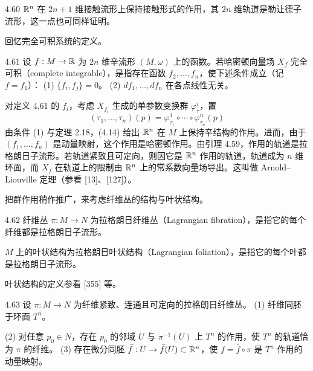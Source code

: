 \begin{remark}{4.60}
  $\mathbb{R}^n$ 在 $2n+1$ 维接触流形上保持接触形式的作用，其 $2n$ 维轨道是勒让德子流形，这一点也可同样证明。
\end{remark}

回忆完全可积系统的定义。

\begin{definition}{4.61}
  设 $f:M\to\mathbb{R}$ 为 $2n$ 维辛流形 $(M,\omega)$ 上的函数。若哈密顿向量场 $X_f$ 完全可积（complete integrable），是指存在函数 $f_2,\dots,f_n$，使下述条件成立（记 $f=f_1$）：
  (1) $\{f_i,f_j\}=0$。
  (2) $df_1,\dots,df_n$ 在各点线性无关。
\end{definition}

对定义 4.61 的 $f_i$，考虑 $X_{f_i}$ 生成的单参数变换群 $\varphi^i_\tau$，置
\begin{equation}
  (\tau_1,\dots,\tau_n)(p)=\varphi^1_{\tau_1}\circ\cdots\circ\varphi^n_{\tau_n}(p) \tag{4.14}
\end{equation}
由条件 (1) 与定理 2.18，(4.14) 给出 $\mathbb{R}^n$ 在 $M$ 上保持辛结构的作用。进而，由于 $(f_1,\dots,f_n)$ 是动量映射，这个作用是哈密顿作用。由引理 4.59，作用的轨道是拉格朗日子流形。若轨道紧致且可定向，则因它是 $\mathbb{R}^n$ 作用的轨道，轨道成为 $n$ 维环面，而 $X_f$ 在轨道上的限制由 $\mathbb{R}^n$ 上的常系数向量场导出。这叫做 Arnold–Liouville 定理（参看 [13]、[127]）。

把群作用稍作推广，来考虑纤维丛的结构与叶状结构。

\begin{definition}{4.62}
  纤维丛 $\pi:M\to N$ 为拉格朗日纤维丛（Lagrangian fibration），是指它的每个纤维都是拉格朗日子流形。

  $M$ 上的叶状结构为拉格朗日叶状结构（Lagrangian foliation），是指它的每个叶都是拉格朗日子流形。
\end{definition}

叶状结构的定义参看 [355] 等。

\begin{theorem*}{4.63}
  设 $\pi:M\to N$ 为纤维紧致、连通且可定向的拉格朗日纤维丛。
  (1) 纤维同胚于环面 $T^n$。

  (2) 对任意 $p_0\in N$，存在 $p_0$ 的邻域 $U$ 与 $\pi^{-1}(U)$ 上 $T^n$ 的作用，使 $T^n$ 的轨道恰为 $\pi$ 的纤维。
  (3) 存在微分同胚 $\bar f:U\to\bar f(U)\subset\mathbb{R}^n$，使 $f=\bar f\circ\pi$ 是 $T^n$ 作用的动量映射。
\end{theorem*}

